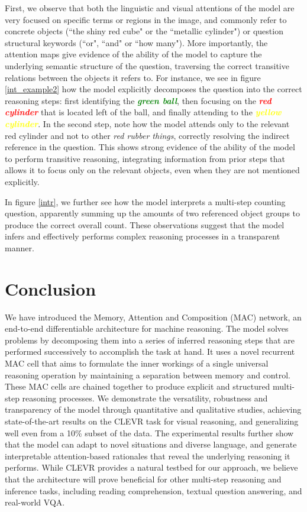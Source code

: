 \documentclass[fleqn]{article}
\begin{document}
First, we observe that both the linguistic and visual attentions of the model are very focused on specific terms or regions in the image, and commonly refer to concrete objects (``the shiny red cube" or the ``metallic cylinder") or question structural keywords (``or", ``and" or ``how many"). More importantly, the attention maps give evidence of the ability of the model to capture the  underlying semantic structure of the question, traversing the correct transitive relations between the objects it refers to. For instance, we see in figure \ref{int_example2} how the model explicitly decomposes the question into the correct reasoning steps: first identifying the \textcolor{green}{\textit{\textbf{green ball}}}, then focusing on the \textcolor{red}{\textit{\textbf{red cylinder}}} that is located left of the ball, and finally attending to the \textcolor{yellow}{\textit{\textbf{yellow cylinder}}}. In the second step, note how the model attends only to the relevant red cylinder and not to other \textit{red rubber things}, correctly resolving the indirect reference in the question. This shows strong evidence of the ability of the model to perform transitive reasoning, integrating information from prior steps that allows it to focus only on the relevant objects, even when they are not mentioned explicitly.


In figure \ref{intr}, we further see how the model interprets a multi-step counting question, apparently summing up the amounts of two referenced object groups to produce the correct overall count. These observations suggest that the model infers and effectively performs complex reasoning processes in a transparent manner.  
\section{Conclusion}
We have introduced the Memory, Attention and Composition (MAC) network, an end-to-end differentiable architecture for machine reasoning. The model solves problems by decomposing them into a series of inferred reasoning steps that are performed successively to accomplish the task at hand. It uses a novel recurrent MAC cell that aims to formulate the inner workings of a single universal reasoning operation by maintaining a separation between memory and control. These MAC cells are chained together to produce explicit and structured multi-step reasoning processes. We demonstrate the versatility, robustness and transparency of the model through quantitative and qualitative studies, achieving state-of-the-art results on the CLEVR task for visual reasoning, and generalizing well even from a 10\% subset of the data. The experimental results further show that the model can adapt to novel situations and diverse language, and generate interpretable attention-based rationales that reveal the underlying reasoning it performs. While CLEVR provides a natural testbed for our approach, we believe that the architecture will prove beneficial for other multi-step reasoning and inference tasks, including reading comprehension, textual question answering, and real-world VQA.
\end{document}
